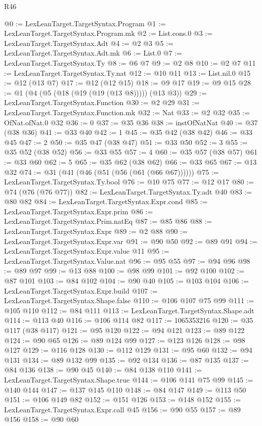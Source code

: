 \begin{lexlean}{R46}
\begin{coremodule}
@0 := LexLeanTarget.TargetSyntax.Program
@1 := LexLeanTarget.TargetSyntax.Program.mk
@2 := List.cons.{0}
@3 := LexLeanTarget.TargetSyntax.Adt
@4 := @2 @3
@5 := LexLeanTarget.TargetSyntax.Adt.mk
@6 := List.{0}
@7 := LexLeanTarget.TargetSyntax.Ty
@8 := @6 @7
@9 := @2 @8
@10 := @2 @7
@11 := LexLeanTarget.TargetSyntax.Ty.nat
@12 := @10 @11
@13 := List.nil.{0}
@15 := @12 (@13 @7)
@17 := @12 (@12 @15)
@18 := @9 @17
@19 := @9 @15
@28 := @1 (@4 (@5 (@18 (@19 (@19 (@13 @8))))) (@13 @3))
@29 := LexLeanTarget.TargetSyntax.Function
@30 := @2 @29
@31 := LexLeanTarget.TargetSyntax.Function.mk
@32 := Nat
@33 := @2 @32
@35 := OfNat.ofNat.{0} @32
@36 := 0
@37 := @35 @36
@38 := instOfNatNat
@40 := @37 (@38 @36)
@41 := @33 @40
@42 := 1
@45 := @35 @42 (@38 @42)
@46 := @33 @45
@47 := 2
@50 := @35 @47 (@38 @47)
@51 := @33 @50
@52 := 3
@55 := @35 @52 (@38 @52)
@56 := @33 @55
@57 := 4
@60 := @35 @57 (@38 @57)
@61 := @33 @60
@62 := 5
@65 := @35 @62 (@38 @62)
@66 := @33 @65
@67 := @13 @32
@74 := @31 (@41 (@46 (@51 (@56 (@61 (@66 @67))))))
@75 := LexLeanTarget.TargetSyntax.Ty.bool
@76 := @10 @75
@77 := @12 @17
@80 := @74 (@76 (@76 @77))
@82 := LexLeanTarget.TargetSyntax.Ty.adt @40
@83 := @80 @82
@84 := LexLeanTarget.TargetSyntax.Expr.cond
@85 := LexLeanTarget.TargetSyntax.Expr.prim
@86 := LexLeanTarget.TargetSyntax.Prim.natEq
@87 := @85 @86
@88 := LexLeanTarget.TargetSyntax.Expr
@89 := @2 @88
@90 := LexLeanTarget.TargetSyntax.Expr.var
@91 := @90 @50
@92 := @89 @91
@94 := LexLeanTarget.TargetSyntax.Expr.value @11
@95 := LexLeanTarget.TargetSyntax.Value.nat
@96 := @95 @55
@97 := @94 @96
@98 := @89 @97
@99 := @13 @88
@100 := @98 @99
@101 := @92 @100
@102 := @87 @101
@103 := @84 @102
@104 := @90 @40
@105 := @103 @104
@106 := LexLeanTarget.TargetSyntax.Expr.build
@107 := LexLeanTarget.TargetSyntax.Shape.false
@110 := @106 @107 @75 @99
@111 := @105 @110
@112 := @84 @111
@113 := LexLeanTarget.TargetSyntax.Shape.adt
@114 := @113 @40
@116 := @106 @114 @82
@117 := 1065353216
@120 := @35 @117 (@38 @117)
@121 := @95 @120
@122 := @94 @121
@123 := @89 @122
@124 := @90 @65
@126 := @89 @124 @99
@127 := @123 @126
@128 := @98 @127
@129 := @116 @128
@130 := @112 @129
@131 := @95 @60
@132 := @94 @131
@134 := @89 @132 @99
@135 := @92 @134
@136 := @87 @135
@137 := @84 @136
@138 := @90 @45
@140 := @84 @138 @110
@141 := LexLeanTarget.TargetSyntax.Shape.true
@144 := @106 @141 @75 @99
@145 := @140 @144
@147 := @137 @145 @110
@148 := @84 @147
@149 := @113 @50
@151 := @106 @149 @82
@152 := @151 @126
@153 := @148 @152
@155 := LexLeanTarget.TargetSyntax.Expr.call @45
@156 := @90 @55
@157 := @89 @156
@158 := @90 @60

\end{coremodule}
\end{lexlean}
